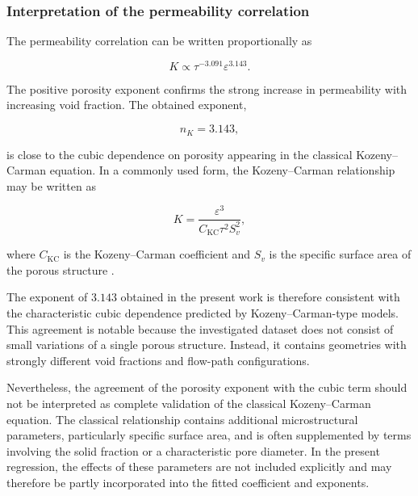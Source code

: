 \documentclass[a4paper]{article}
\begin{document}
\subsubsection{Interpretation of the permeability correlation}
\label{sec:interpretation_permeability_correlation}

The permeability correlation can be written proportionally as

\begin{equation}
K
\propto
\tau^{-3.091}
\varepsilon^{3.143}.
\label{eq:permeability_proportional_form}
\end{equation}

The positive porosity exponent confirms the strong increase in permeability
with increasing void fraction. The obtained exponent,

\begin{equation}
n_{K}
=
3.143,
\end{equation}

is close to the cubic dependence on porosity appearing in the classical
Kozeny--Carman equation. In a commonly used form, the Kozeny--Carman
relationship may be written as

\begin{equation}
K
=
\frac{\varepsilon^{3}}
{C_{\mathrm{KC}}\tau^{2}S_{v}^{2}},
\label{eq:kozeny_carman_comparison}
\end{equation}

where $C_{\mathrm{KC}}$ is the Kozeny--Carman coefficient and $S_{v}$ is the
specific surface area of the porous structure
\cite{XuYu2008,Costa2006}.

The exponent of $3.143$ obtained in the present work is therefore consistent
with the characteristic cubic dependence predicted by
Kozeny--Carman-type models. This agreement is notable because the investigated
dataset does not consist of small variations of a single porous structure.
Instead, it contains geometries with strongly different void fractions and
flow-path configurations.

Nevertheless, the agreement of the porosity exponent with the cubic term
should not be interpreted as complete validation of the classical
Kozeny--Carman equation. The classical relationship contains additional
microstructural parameters, particularly specific surface area, and is often
supplemented by terms involving the solid fraction or a characteristic pore
diameter. In the present regression, the effects of these parameters are not
included explicitly and may therefore be partly incorporated into the fitted
coefficient and exponents.
\end{document}
